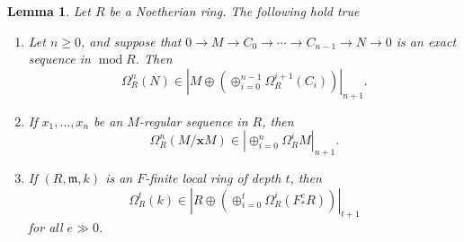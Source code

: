 \documentclass[11pt]{amsart}
\theoremstyle{plain}
\newtheorem{lemma}[theorem]{Lemma}
\theoremstyle{definition}
\numberwithin{equation}{section}
\numberwithin{theorem}{section}
\begin{document}
\begin{lemma}\label{lem:isolated_singularity_lemma}
     Let $R$ be a Noetherian ring. The following hold true 
    \begin{enumerate}
        \item Let $n\geq 0$, and suppose that $0\to M \to C_0\to \cdots\to C_{n-1}\to N\to 0$ is an exact sequence in $\operatorname{mod} R$. Then 
        \begin{displaymath}
            \Omega^n_R (N)\in |M\oplus (\oplus_{i=0}^{n-1}\Omega_R^{i+1}(C_i))|_{n+1}.
        \end{displaymath}
    
        \item If $x_1,\ldots,x_n$ be an $M$-regular sequence in $R$, then 
        \begin{displaymath}
            \Omega^n_R(M/\mathbf x M)\in |\oplus_{i=0}^n \Omega^i_R M|_{n+1}.
        \end{displaymath}
    
        \item If $(R,\mathfrak m,k)$ is an $F$-finite local ring of depth $t$, then 
        \begin{displaymath}
            \Omega^t_R (k) \in |R \oplus (\oplus_{i=0}^t \Omega^i_R (F^e_* R))|_{t+1}
        \end{displaymath}
        for all $e\gg 0$.    
    \end{enumerate}
\end{lemma}
\end{document}
